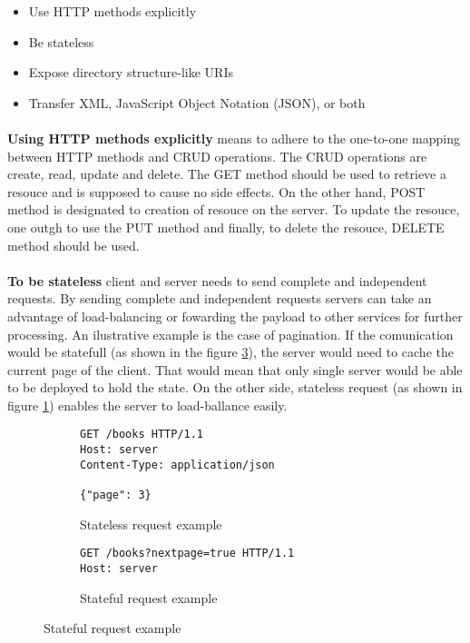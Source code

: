 \begin{itemize}
  \item Use HTTP methods explicitly
  \item Be stateless
  \item Expose directory structure-like URIs
  \item Transfer XML, JavaScript Object Notation (JSON), or both
\end{itemize}

\paragraph{}
\textbf{Using HTTP methods explicitly} means to adhere to the one-to-one mapping between HTTP methods and CRUD operations. The CRUD operations are create, read, update and delete. The GET method should be used to retrieve a resouce and is supposed to cause no side effects. On the other hand, POST method is designated to creation of resouce on the server. To update the resouce, one outgh to use the PUT method and finally, to delete the resouce, DELETE method should be used.

\paragraph{}
\textbf{To be stateless} client and server needs to send complete and independent requests. By sending complete and independent requests servers can take an advantage of load-balancing or fowarding the payload to other services for further processing. An ilustrative example is the case of pagination. If the comunication would be statefull (as shown in the figure \ref{fig:Stateful request example}), the server would need to cache the current page of the client. That would mean that only single server would be able to be deployed to hold the state. On the other side, stateless request (as shown in figure \ref{fig:Stateless request example}) enables the server to load-ballance easily.

\begin{figure}[h]
  \begin{subfigure}{}
    \begin{minipage}{0.5\textwidth}
      \begin{verbatim}
GET /books HTTP/1.1
Host: server
Content-Type: application/json

{"page": 3}
      \end{verbatim}
      \caption{Stateless request example}
      \label{fig:Stateless request example}
    \end{minipage}
  \end{subfigure}
  \begin{subfigure}{}
    \begin{minipage}{0.5\textwidth}
      \begin{verbatim}
GET /books?nextpage=true HTTP/1.1
Host: server
      \end{verbatim}
      \caption{Stateful request example}
      \label{fig:Stateful request example}
    \end{minipage}
  \end{subfigure}
\end{figure}


